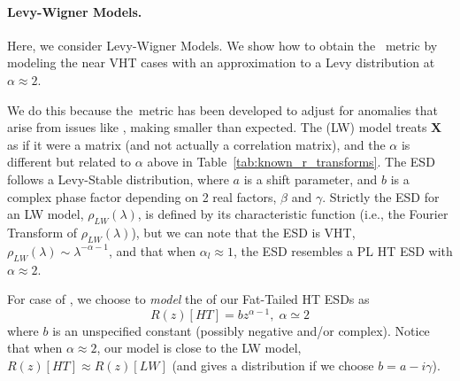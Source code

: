 \paragraph{Levy-Wigner Models.}

Here, we consider Levy-Wigner Models.
We show how to obtain the \WW~\ALPHAHAT metric by modeling the near VHT cases with an approximation to a Levy distribution at $\alpha\approx 2$.  

We do this because the~\ALPHAHAT metric has been developed to adjust for \SCALE anomalies that arise from issues like \CorrelationTraps,
making \ALPHA smaller than expected.
The  \LevyWigner (LW) model treats  $\mathbf{X}$ as if it were a \Wigner matrix (and not actually a correlation  matrix), and the $\alpha$ is different but related to $\alpha$ above in Table~\ref{tab:known_r_transforms}.
The ESD follows a Levy-Stable distribution, where $a$ is a shift parameter, and $b$ is a complex phase factor depending on 2 real factors, $\beta$ and $\gamma$.
Strictly the ESD for an LW model, $\rho_{LW}(\lambda)$, is defined by its characteristic function (i.e., the Fourier Transform of $\rho_{LW}(\lambda)$), but
we can note that the ESD is VHT, $\rho_{LW}(\lambda)\sim\lambda^{-\alpha-1}$, and that when $\alpha_{l}\approx 1$, the ESD resembles a PL HT ESD with $\alpha\approx 2$.

For case of \IdealLearning,  we choose to \emph{model} the \RTransform of our Fat-Tailed HT ESDs as
\begin{equation}
\label{eqn:LW_model_0} 
R(z)[HT] = bz^{\alpha-1},\;\alpha\simeq 2
\end{equation}
where $b$ is an unspecified constant (possibly negative and/or complex).
Notice that when $\alpha\approx 2$, our model is close to the LW model, $R(z)[HT]\approx R(z)[LW]$
(and gives a \Cauchy distribution if we choose $b=a-i\gamma$).

